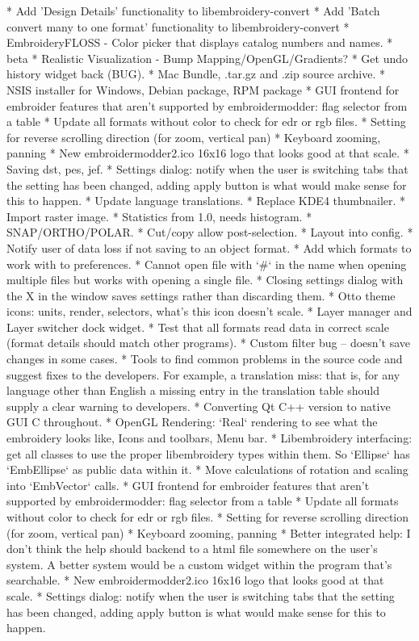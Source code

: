\documentclass[a4paper]{report}
\begin{document}
{  * Add 'Design Details' functionality to libembroidery-convert
  * Add 'Batch convert many to one format' functionality to libembroidery-convert
  * EmbroideryFLOSS - Color picker that displays catalog numbers and names.
* beta
  * Realistic Visualization - Bump Mapping/OpenGL/Gradients?
  * Get undo history widget back (BUG).
  * Mac Bundle, .tar.gz and .zip source archive.
  * NSIS installer for Windows, Debian package, RPM package
  * GUI frontend for embroider features that aren't supported by embroidermodder: flag selector from a table
  * Update all formats without color to check for edr or rgb files.
  * Setting for reverse scrolling direction (for zoom, vertical pan)
  * Keyboard zooming, panning
  * New embroidermodder2.ico 16x16 logo that looks good at that scale.
  * Saving dst, pes, jef.
  * Settings dialog: notify when the user is switching tabs that the setting has been changed, adding apply button is what would make sense for this to happen.
  * Update language translations.
  * Replace KDE4 thumbnailer.
  * Import raster image.
  * Statistics from 1.0, needs histogram.
  * SNAP/ORTHO/POLAR.
  * Cut/copy allow post-selection.
  * Layout into config.
  * Notify user of data loss if not saving to an object format.
  * Add which formats to work with to preferences.
  * Cannot open file with `\#` in the name when opening multiple files but works with opening a single file.
  * Closing settings dialog with the X in the window saves settings rather than discarding them.
  * Otto theme icons: units, render, selectors, what's this icon doesn't scale.
  * Layer manager and Layer switcher dock widget.
  * Test that all formats read data in correct scale (format details should match other programs).
  * Custom filter bug -- doesn't save changes in some cases.
  * Tools to find common problems in the source code and suggest fixes to the developers. For example, a translation miss: that is, for any language other than English a missing entry in the translation table should supply a clear warning to developers.
  * Converting Qt C++ version to native GUI C throughout.
  * OpenGL Rendering: `Real` rendering to see what the embroidery looks like, Icons and toolbars, Menu bar.
  * Libembroidery interfacing: get all classes to use the proper libembroidery types within them. So `Ellipse` has `EmbEllipse` as public data within it.
  * Move calculations of rotation and scaling into `EmbVector` calls.
  * GUI frontend for embroider features that aren't supported by embroidermodder: flag selector from a table
  * Update all formats without color to check for edr or rgb files.
  * Setting for reverse scrolling direction (for zoom, vertical pan)
  * Keyboard zooming, panning
  * Better integrated help: I don't think the help should backend to a html file somewhere on the user's system. A better system would be a custom widget within the program that's searchable.
  * New embroidermodder2.ico 16x16 logo that looks good at that scale.
  * Settings dialog: notify when the user is switching tabs that the setting has been changed, adding apply button is what would make sense for this to happen.

}
\end{document}
